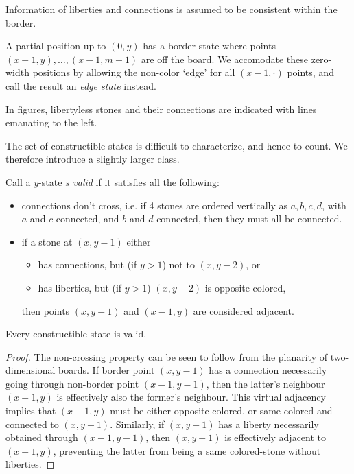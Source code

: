 \documentclass{article}
\begin{document}
Information of liberties and connections is assumed to
be consistent within the border.

A partial position up to $(0,y)$ has a border state where
points $(x-1,y),\ldots,(x-1,m-1)$ are off the board.
We accomodate these zero-width positions
by allowing the non-color `edge' for all $(x-1,\cdot)$ points,
and call the result an {\em edge state} instead.

In figures, libertyless stones and their connections are indicated with
lines emanating to the left.

The set of constructible states is difficult to characterize,
and hence to count. We therefore introduce a slightly larger class.

\begin{defin}
Call a $y$-state $s$ {\em valid} if it satisfies all the following:
\begin{itemize}
\item connections don't cross, i.e. if 4 stones are ordered vertically as
      $a,b,c,d$, with $a$ and $c$ connected, and $b$ and $d$ connected,
      then they must all be connected.
\item if a stone at $(x,y-1)$ either
\begin{itemize}
\item has connections, but (if $y>1$) not to $(x,y-2)$, or
\item has liberties, but (if $y>1$) $(x,y-2)$ is opposite-colored,
\end{itemize}
      then points $(x,y-1)$ and $(x-1,y)$ are considered adjacent.
\end{itemize}
\end{defin}

\begin{lemma}
\label{constructibleisvalid}
Every constructible state is valid.
\end{lemma}

\begin{proof}
The non-crossing property can be seen to follow from the planarity
of two-dimensional boards.
If border point $(x,y-1)$ has a connection
necessarily going through non-border point $(x-1,y-1)$,
then the latter's neighbour $(x-1,y)$ is effectively
also the former's neighbour. This virtual adjacency
implies that $(x-1,y)$ must be either opposite colored,
or same colored and connected to $(x,y-1)$.
Similarly, if $(x,y-1)$ has a liberty necessarily obtained through
$(x-1,y-1)$, then $(x,y-1)$ is effectively adjacent to $(x-1,y)$,
preventing the latter from being a same colored-stone without liberties.
\end{proof}
\end{document}
